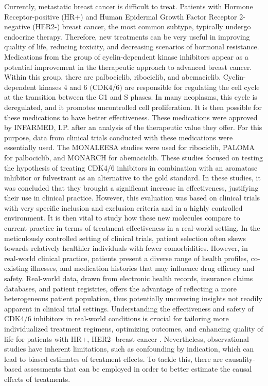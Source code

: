 Currently, metastatic breast cancer is difficult to treat. Patients with Hormone Receptor-positive (HR+) and Human Epidermal Growth Factor Receptor 2-negative (HER2-) breast cancer, the most common subtype, typically undergo endocrine therapy. Therefore, new treatments can be very useful in improving quality of life, reducing toxicity, and decreasing scenarios of hormonal resistance.
Medications from the group of cyclin-dependent kinase inhibitors appear as a potential improvement in the therapeutic approach to advanced breast cancer. Within this group, there are palbociclib, ribociclib, and abemaciclib. Cyclin-dependent kinases 4 and 6 $($CDK4/6$)$ are responsible for regulating the cell cycle at the transition between the G1 and S phases. In many neoplasms, this cycle is deregulated, and it promotes uncontrolled cell proliferation. It is then possible for these medications to have better effectiveness. These medications were approved by INFARMED, I.P. after an analysis of the therapeutic value they offer. For this purpose, data from clinical trials conducted with these medications were essentially used. The MONALEESA \cite{hortobagyiUpdatedResultsMONALEESA22018, slamonPhaseIIIRandomized2018, tripathyRibociclibEndocrineTherapy2018} studies were used for ribociclib, PALOMA \cite{vermaPalbociclibCombinationFulvestrant2016, rugoImpactPalbociclibLetrozole2018, finnCyclindependentKinaseInhibitor2015a} for palbociclib, and MONARCH \cite{goetzMONARCHAbemaciclibInitial2017, sledgeMONARCHAbemaciclibCombination2017} for abemaciclib.
These studies focused on testing the hypothesis of treating CDK4/6 inhibitors in combination with an aromatase inhibitor or fulvestrant as an alternative to the gold standard. In these studies, it was concluded that they brought a significant increase in effectiveness, justifying their use in clinical practice.
However, this evaluation was based on clinical trials with very specific inclusion and exclusion criteria and in a highly controlled environment. It is then vital to study how these new molecules compare to current practice in terms of treatment effectiveness in a real-world setting. In the meticulously controlled setting of clinical trials, patient selection often skews towards relatively healthier individuals with fewer comorbidities. However, in real-world clinical practice, patients present a diverse range of health profiles, co-existing illnesses, and medication histories that may influence drug efficacy and safety. Real-world data, drawn from electronic health records, insurance claims databases, and patient registries, offers the advantage of reflecting a more heterogeneous patient population, thus potentially uncovering insights not readily apparent in clinical trial settings. Understanding the effectiveness and safety of CDK4/6 inhibitors in real-world conditions is crucial for tailoring more individualized treatment regimens, optimizing outcomes, and enhancing quality of life for patients with HR+, HER2- breast cancer \cite{harbeckCDK4InhibitorsHR2021}. Nevertheless, observational studies have inherent limitations, such as confounding by indication, which can lead to biased estimates of treatment effects. To tackle this, there are causality-based assessments that can be employed in order to better estimate the causal effects of treatments.
